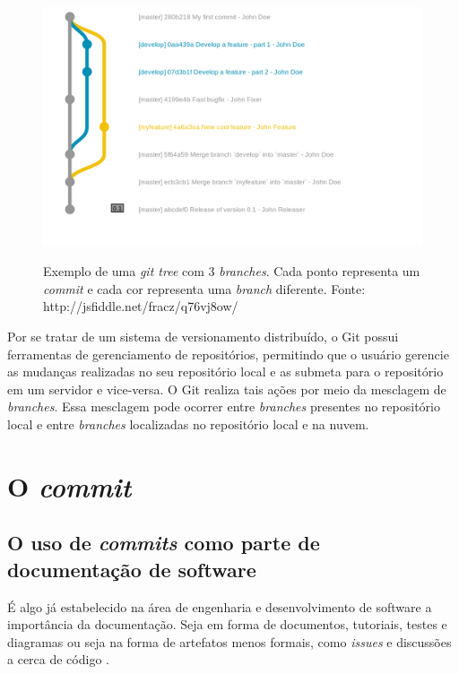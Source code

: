 \begin{figure}[b]
\includegraphics[width=12cm]{figuras/gittree.png}
\centering
\label{fig:git_tree}
\caption{Exemplo de uma \textit{git tree} com 3 \textit{branches}. Cada ponto representa um \textit{commit} e cada cor representa uma \textit{branch} diferente. Fonte: http://jsfiddle.net/fracz/q76vj8ow/}
\end{figure}


Por se tratar de um sistema de versionamento distribuído, o Git possui ferramentas de gerenciamento de repositórios, permitindo que o usuário gerencie as mudanças realizadas no seu repositório local e as submeta para o repositório em um servidor e vice-versa. O Git realiza tais ações por meio da mesclagem de \textit{branches}. Essa mesclagem pode ocorrer entre \textit{branches} presentes no repositório local e entre \textit{branches} localizadas no repositório local e na nuvem.


% 
% 
% 
% 
% 
% 
% 
\newpage
\section{O \textit{commit}}
\label{section:commit}

\subsection{O uso de \textit{commits} como parte de documentação de software}
É algo já estabelecido na área de engenharia e desenvolvimento de software a importância da documentação. Seja em forma de documentos, tutoriais, testes e diagramas ou seja na forma de artefatos menos formais, como \textit{issues} e discussões a cerca de código \cite{importance_of_software_documentation}.

